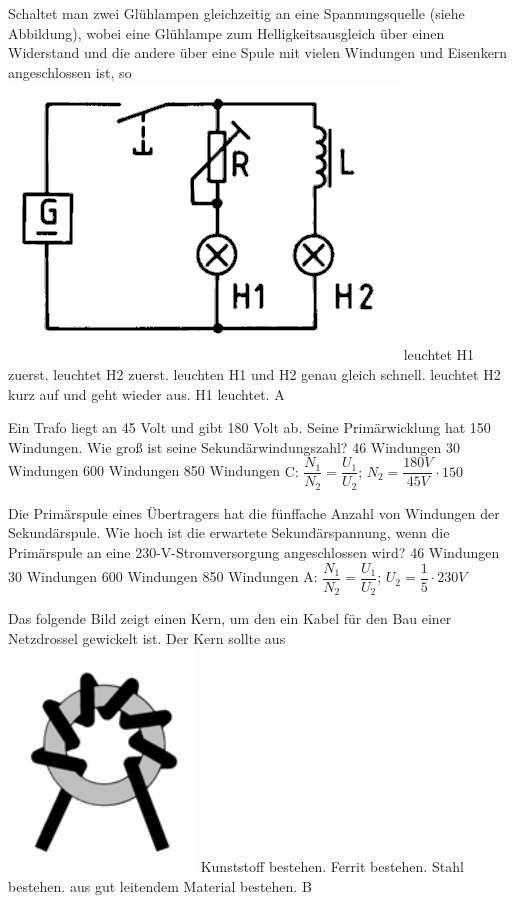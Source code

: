 {Schaltet man zwei Glühlampen gleichzeitig an eine Spannungsquelle (siehe Abbildung), wobei eine Glühlampe zum Helligkeitsausgleich über einen Widerstand und die andere über eine Spule mit vielen Windungen und Eisenkern angeschlossen ist, so\\ \includegraphics[scale=0.35]{Spule/Bilder/TC305.png}}%
{leuchtet H1 zuerst.}%
{leuchtet H2 zuerst.}%
{leuchten H1 und H2 genau gleich schnell.}%
{leuchtet H2 kurz auf und geht wieder aus. H1 leuchtet.}%
{A}%

{Ein Trafo liegt an 45 Volt und gibt 180 Volt ab. Seine Primärwicklung hat 150 Windungen. Wie groß ist seine Sekundärwindungszahl?}%
{46 Windungen}%
{30 Windungen}%
{600 Windungen}%
{850 Windungen}%
{C: $\dfrac{N_1}{N_2} = \dfrac{U_1}{U_2}$; $N_2 = \dfrac{180V}{45V} \cdot 150$}%

{Die Primärspule eines Übertragers hat die fünffache Anzahl von Windungen der Sekundärspule. Wie hoch ist die erwartete Sekundärspannung, wenn die Primärspule an eine 230-V-Stromversorgung angeschlossen wird?}%
{46 Windungen}%
{30 Windungen}%
{600 Windungen}%
{850 Windungen}%
{A: $\dfrac{N_1}{N_2} = \dfrac{U_1}{U_2}$; $U_2 = \dfrac{1}{5} \cdot 230V$}%

{Das folgende Bild zeigt einen Kern, um den ein Kabel für den Bau einer Netzdrossel gewickelt ist. Der Kern sollte aus\\ \includegraphics[scale=0.9]{Spule/Bilder/TC304.png}}%
{Kunststoff bestehen.}%
{Ferrit bestehen.}%
{Stahl bestehen.}%
{aus gut leitendem Material bestehen.}%
{B}%


